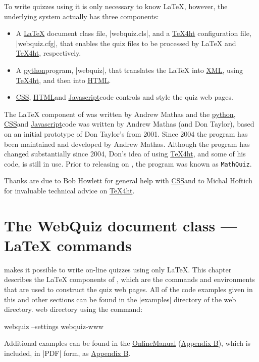 \documentclass[svgnames]{article}
\newcommand\TeXfht{\href{https://www.ctan.org/tex4ht}{TeX4ht}\xspace}
\newcommand\Ctan{\ctan[]{ctan}}
\newcommand{\HTML}{\href{https://www.w3schools.com/html/html_intro.asp}{HTML}}
\newcommand\CSS{\href{https://www.w3schools.com/css}{CSS}}
\newcommand\XML{\href{https://www.w3schools.com/xml/xml_whatis.asp}{XML}}
\newcommand\Javascript{\href{https://www.w3schools.com/Js/}{Javascript}}
\newcommand\python[1][python]{\href{https://www.python.org/}{#1}}
\newcommand\OnlineManual{\href{http://www.maths.usyd.edu.au/u/mathas/WebQuiz/webquiz-online-manual.html}{OnlineManual} (\hyperref[S:online]{Appendix B})}
\begin{document}
      To write quizzes using \WebQuiz it is only necessary to know
      \LaTeX, however, the underlying \WebQuiz system actually has three
      components:
      \begin{itemize}
        \item A \href{https://www.latex-project.org/}{\LaTeX} document class
        file, \BashCode|webquiz.cls|, and a \TeXfht
        configuration file, \BashCode|webquiz.cfg|, that enables the
        quiz files to be processed by \LaTeX{} and \TeXfht, respectively.
        \item A \python program,
        \BashCode|webquiz|, that translates the
        \LaTeX{} into \XML, using \TeXfht, and then into \HTML.
        \item \CSS, \HTML and \Javascript code controls and style the
        quiz web pages.
      \end{itemize}

     The \LaTeX{} component of \WebQuiz{} was written by Andrew Mathas and
     the \python, \CSS and \Javascript code was written by Andrew Mathas (and
     Don Taylor), based on an initial prototype of Don Taylor's from 2001.
     Since 2004 the program has been maintained and developed by Andrew
     Mathas. Although the program has changed substantially since 2004,
     Don's idea of using \TeXfht, and some of his code, is still
     in use. Prior to releasing \WebQuiz on \Ctan, the program was known
     as \texttt{MathQuiz}.

     Thanks are due to Bob Howlett for general help with \CSS and to
     Michal Hoftich for invaluable technical advice on \TeXfht.

   \section{The WebQuiz document class --- \LaTeX{} commands}
   \label{S:documentclass}

    \WebQuiz makes it possible to write on-line quizzes using only \LaTeX.
    This chapter describes the \LaTeX{} components of \WebQuiz, which are
    the commands and environments that are used to construct the quiz web
    pages. All of the code examples given in this and other sections can
    be found in the \BashCode|examples| directory of the \WebQuiz web
    directory.%
    \WebQuiz web directory using the command:
    \begin{bashcode}
         webquiz --settings webquiz-www
    \end{bashcode}
    Additional examples can be found in the \OnlineManual, which is
    included, in \BashCode|PDF| form, as \hyperref[S:online]{Appendix B}.
\end{document}
